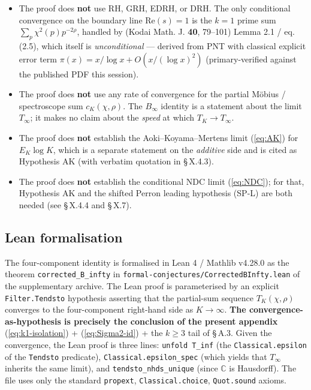 \begin{itemize}
\item
  The proof does \textbf{not} use RH, GRH, EDRH, or DRH. The only
  conditional convergence on the boundary line \(\mathrm{Re}(s) = 1\) is
  the \(k = 1\) prime sum \(\sum_p \chi^2(p) p^{-2\rho}\), handled by
  \cite{Akatsuka2017EulerProduct} (Kodai Math. J. \textbf{40}, 79--101) Lemma 2.1 / eq.
  (2.5), which itself is \emph{unconditional} --- derived from PNT with
  classical explicit error term \(\pi(x)=x/\log x+O(x/(\log x)^2)\)
  (primary-verified against the published PDF this session).
\item
  The proof does \textbf{not} use any rate of convergence for the partial
  Möbius / spectroscope sum \(c_K(\chi, \rho)\). The \(B_\infty\) identity
  is a statement about the limit \(T_\infty\); it makes no claim about
  the \emph{speed} at which \(T_K \to T_\infty\).
\item
  The proof does \textbf{not} establish the Aoki--Koyama--Mertens limit
  (\ref{eq:AK}) for \(E_K \log K\), which is a separate statement on the
  \emph{additive} side and is cited as Hypothesis AK (with verbatim
  quotation in \S\,X.4.3).
\item
  The proof does \textbf{not} establish the conditional NDC limit
  (\ref{eq:NDC}); for that, Hypothesis AK and the shifted Perron
  leading hypothesis (SP-L) are both needed (see \S\,X.4.4 and \S\,X.7).
\end{itemize}

\subsection{Lean formalisation}

The four-component identity is formalised in Lean 4 / Mathlib v4.28.0
as the theorem \texttt{corrected\_B\_infty} in
\texttt{formal-conjectures/CorrectedBInfty.lean} of the supplementary
archive. The Lean proof is parameterised by an explicit
\texttt{Filter.Tendsto} hypothesis asserting that the partial-sum sequence
\(T_K(\chi,\rho)\) converges to the four-component right-hand side as
\(K \to \infty\). \textbf{The convergence-as-hypothesis is precisely the
conclusion of the present appendix} (\ref{eq:k1-isolation}) +
(\ref{eq:Sigma2-id}) + the \(k \ge 3\) tail of \S\,A.3. Given the
convergence, the Lean proof is three lines: \texttt{unfold\ T\_inf} (the
\texttt{Classical.epsilon} of the \texttt{Tendsto} predicate),
\texttt{Classical.epsilon\_spec} (which yields that \(T_\infty\) inherits the
same limit), and \texttt{tendsto\_nhds\_unique} (since \(\mathbb{C}\) is
Hausdorff). The file uses only the standard
\texttt{propext}, \texttt{Classical.choice}, \texttt{Quot.sound} axioms.

